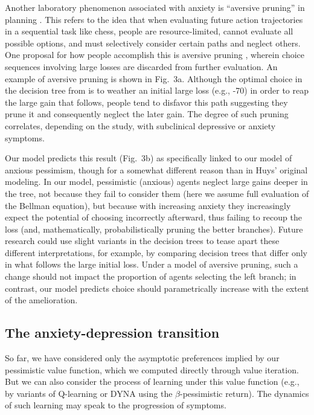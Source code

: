 \documentclass[manuscript]{stjour}
\begin{document}
Another laboratory phenomenon associated with anxiety is ``aversive pruning'' in planning \citep{Huys2012, Lally2017}. This refers to the idea that when evaluating future action trajectories in a sequential task like chess, people are resource-limited, cannot evaluate all possible options, and must selectively consider certain paths and neglect others. One proposal for how people accomplish this is aversive pruning \citep{Huys2012}, wherein choice sequences involving large losses are discarded from further evaluation. An example of aversive pruning is shown in Fig.~3a. Although the optimal choice in the decision tree from is to weather an initial large loss (e.g., -70) in order to reap the large gain that follows, people tend to disfavor this path suggesting they prune it and consequently neglect the later gain. The degree of such pruning correlates, depending on the study, with subclinical depressive \citep{Huys2012} or anxiety \citep{Lally2017} symptoms. 

Our model predicts this result (Fig.~3b) as specifically linked to our model of anxious pessimism, though for a somewhat different reason than in Huys' original modeling. In our model, pessimistic (anxious) agents neglect large gains deeper in the tree, not because they fail to consider them (here we assume full evaluation of the Bellman equation), but because with increasing anxiety they increasingly expect the potential of choosing incorrectly afterward, thus failing to recoup the loss (and, mathematically, probabilistically pruning the better branches). Future research could use slight variants in the decision trees to tease apart these different interpretations, for example, by comparing decision trees that differ only in what follows the large initial loss. Under a model of aversive pruning, such a change should not impact the proportion of agents selecting the left branch; in contrast, our model predicts choice should parametrically increase with the extent of the amelioration.

\subsection{The anxiety-depression transition}

So far, we have considered only the asymptotic preferences implied by our pessimistic value function, which we computed directly through value iteration. But we can also consider the process of learning under this value function (e.g., by variants of Q-learning \citep{SuttonBarto2018} or DYNA \citep{sutton1991, russek_predictive_2017} using the $\beta$-pessimistic return). The dynamics of such learning may speak to the progression of symptoms.
\end{document}
